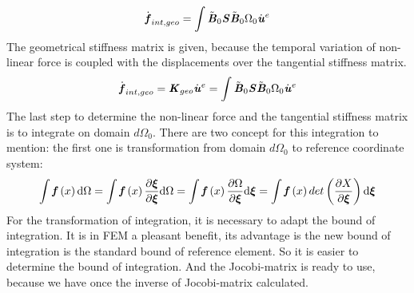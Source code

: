 \begin{equation}
\dot{\textbf{\textit{f}}}_{int,geo} = \int \tilde{\textbf{\textit{B}}}_0 \textbf{\textit{S}} \tilde{\textbf{\textit{B}}}_0 \mathrm{\Omega_0} \dot{\textbf{\textit{u}}}^e
\end{equation}
The geometrical stiffness matrix is given, because the temporal variation of non-linear force is coupled with the displacements over the tangential stiffness matrix.
\begin{equation}
\dot{\textbf{\textit{f}}}_{int,geo} = \textbf{\textit{K}}_{geo} \dot{\textbf{\textit{u}}}^e =\int \tilde{\textbf{\textit{B}}}_0 \textbf{\textit{S}} \tilde{\textbf{\textit{B}}}_0 \mathrm{\Omega_0} \dot{\textbf{\textit{u}}}^e
\end{equation}
The last step to determine the non-linear force and the tangential stiffness matrix is to integrate on domain $d\Omega_0$. There are two concept for this integration to mention: the first one is transformation from domain $d\Omega_0$ to reference coordinate system:
\begin{equation}
\int {\textbf{\textit{f}}}\left(x\right) \mathrm{d}\Omega = \int {\textbf{\textit{f}}}\left(x\right) \frac{\partial \boldsymbol{\xi}}{\partial \boldsymbol{\xi}} \mathrm{d}\Omega = \int {\textbf{\textit{f}}}\left(x\right) \frac{\partial \Omega}{\partial \boldsymbol{\xi}} \mathrm{d}\boldsymbol{\xi} = \int {\textbf{\textit{f}}}\left(x\right) det \left(\frac{\partial X}{\partial \boldsymbol{\xi}}\right) \mathrm{d}\boldsymbol{\xi}
\end{equation}
For the transformation of integration, it is necessary to adapt the bound of integration. It is in FEM a pleasant benefit, its advantage is the new bound of integration is the standard bound of reference element. So it is easier to determine the bound of integration. And the Jocobi-matrix is ready to use, because we have once the inverse of Jocobi-matrix calculated.

